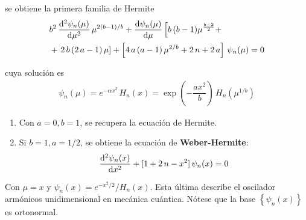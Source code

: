 se obtiene la primera familia de Hermite
\begin{align*}
&{} b^{2} \, \dv[2]{\psi_{n} (\mu)}{\mu} \, \mu^{2 (b-1)/b} + \dv{\psi_{n}(\mu)}{\mu} \left[ b \, (b-1) \mu^{\frac{b-2}{2}}  + \right. \\
&+\left. 2 \, b \, (2 \, a - 1) \, \mu \right] + \left[ 4 \, a \, (a - 1) \, \mu^{2/b} + 2 \, n + 2 \, a \right] \, \psi_{n} (\mu) = 0
\end{align*}

cuya solución es
\begin{align*}
\psi_{n} (\mu) = e^{-\alpha x^{2}} \, H_{n} (x) = \exp \left( - \dfrac{a x^{2}}{b} \right) \, H_{n} (\mu^{1/b})
\end{align*}

\begin{enumerate}[label=\roman*.)]
\item Con $a = 0, b = 1$, se recupera la ecuación de Hermite.
\item Si $b = 1, a = 1/2$, se obtiene la ecuación de \textbf{Weber-Hermite}:
\begin{align}
\dv[2]{\psi_{n} (x)}{x} + [ 1 + 2 \, n - x^{2} ] \, \psi_{n} (x) = 0
\label{eq:ecuacion_08_65}
\end{align}
\end{enumerate}

Con $\mu = x$ y $\psi_{n} (x) = e^{-x^{2}/2} / H_{n} (x)$. Esta última describe el oscilador armónicos unidimensional en mecánica cuántica. Nótese que la base $\left\{ \psi_{n} (x) \right\}$ es ortonormal.
